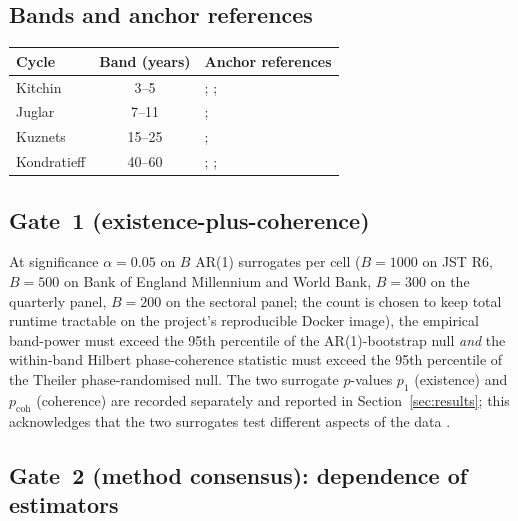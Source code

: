 \subsection{Bands and anchor references}

\begin{center}
\begin{tabularx}{\linewidth}{@{}l c X@{}}
\toprule
\textbf{Cycle} & \textbf{Band (years)} & \textbf{Anchor references} \\
\midrule
Kitchin     & 3--5   & \citet{kitchin1923}; \citet{wen2005}; \citet{diebolt_doliger2008} \\
Juglar      & 7--11  & \citet{juglar1862}; \citet{schumpeter1939} \\
Kuznets     & 15--25 & \citet{kuznets1930}; \citet{korotayev_tsirel2010} \\
Kondratieff & 40--60 & \citet{kondratieff1925}; \citet{modelski1987}; \citet{korotayev_tsirel2010} \\
\bottomrule
\end{tabularx}
\end{center}

\subsection{Gate~1 (existence-plus-coherence)}

At significance \(\alpha=0.05\) on \(B\) AR(1) surrogates per
cell (\(B=1000\) on JST R6, \(B=500\) on Bank of England Millennium
and World Bank, \(B=300\) on the quarterly panel, \(B=200\) on the
sectoral panel; the count is chosen to keep total runtime tractable
on the project's reproducible Docker image), the empirical
band-power must exceed the 95th percentile of the AR(1)-bootstrap
null \emph{and} the within-band Hilbert phase-coherence statistic
must exceed the 95th percentile of the Theiler phase-randomised
null. The two surrogate \(p\)-values \(p_1\) (existence) and
\(p_{\mathrm{coh}}\) (coherence) are recorded separately and
reported in Section~\ref{sec:results}; this acknowledges that the
two surrogates test different aspects of the data
\citep{schreiber_schmitz2000}.

\subsection{Gate~2 (method consensus): dependence of estimators}

